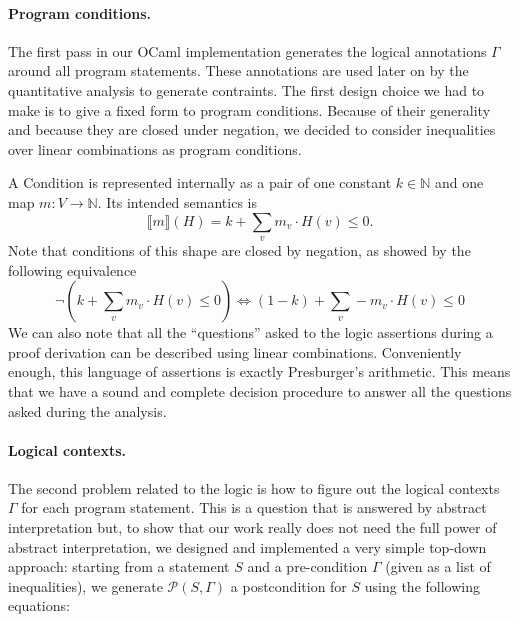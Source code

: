 \documentclass[10pt]{article}
\begin{document}
\paragraph{Program conditions.}
The first pass in our OCaml implementation generates the
logical annotations $\Gamma$ around all program statements.
These annotations are used later on by the quantitative
analysis to generate contraints.
%
The first design choice we had to make is to give a fixed form
to program conditions.  Because of their generality and because
they are closed under negation, we decided to consider
inequalities over linear combinations as program conditions.
A Condition is represented internally as a pair of one constant
$k \in \mathbb N$ and one map $m : V \rightarrow \mathbb N$.
Its intended semantics is
$$
\llbracket m \rrbracket(H) = k + \sum_v m_v \cdot H(v) \le 0.
$$
Note that conditions of this shape are closed by negation, as showed
by the following equivalence
$$
\neg (k + \sum_v m_v \cdot H(v) \le 0)
\Leftrightarrow (1-k) + \sum_v -m_v \cdot H(v) \le 0
$$
We can also note that all the ``questions'' asked to the logic
assertions during a proof derivation can be described using
linear combinations.  Conveniently enough, this language of
assertions is exactly Presburger's arithmetic.  This means that
we have a sound and complete decision procedure to answer
all the questions asked during the analysis.

\paragraph{Logical contexts.}
The second problem related to the logic is how to figure out
the logical contexts $\Gamma$ for each program statement.
This is a question that is answered by abstract interpretation
but, to show that our work really does not need the full power
of abstract interpretation, we designed and implemented a very
simple top-down approach: starting from a statement $S$ and
a pre-condition $\Gamma$ (given as a list of inequalities), we
generate $\mathcal P(S, \Gamma)$ a postcondition for $S$ using the
following equations:
\end{document}
